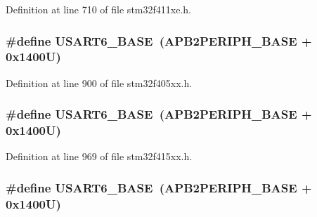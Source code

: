 Definition at line 710 of file stm32f411xe.\+h.

\subsubsection[{\texorpdfstring{U\+S\+A\+R\+T6\+\_\+\+B\+A\+SE}{USART6_BASE}}]{\setlength{\rightskip}{0pt plus 5cm}\#define U\+S\+A\+R\+T6\+\_\+\+B\+A\+SE~({\bf A\+P\+B2\+P\+E\+R\+I\+P\+H\+\_\+\+B\+A\+SE} + 0x1400\+U)}\hypertarget{group___peripheral__registers__structures_gade4d3907fd0387ee832f426f52d568bb}{}\label{group___peripheral__registers__structures_gade4d3907fd0387ee832f426f52d568bb}


Definition at line 900 of file stm32f405xx.\+h.

\subsubsection[{\texorpdfstring{U\+S\+A\+R\+T6\+\_\+\+B\+A\+SE}{USART6_BASE}}]{\setlength{\rightskip}{0pt plus 5cm}\#define U\+S\+A\+R\+T6\+\_\+\+B\+A\+SE~({\bf A\+P\+B2\+P\+E\+R\+I\+P\+H\+\_\+\+B\+A\+SE} + 0x1400\+U)}\hypertarget{group___peripheral__registers__structures_gade4d3907fd0387ee832f426f52d568bb}{}\label{group___peripheral__registers__structures_gade4d3907fd0387ee832f426f52d568bb}


Definition at line 969 of file stm32f415xx.\+h.

\subsubsection[{\texorpdfstring{U\+S\+A\+R\+T6\+\_\+\+B\+A\+SE}{USART6_BASE}}]{\setlength{\rightskip}{0pt plus 5cm}\#define U\+S\+A\+R\+T6\+\_\+\+B\+A\+SE~({\bf A\+P\+B2\+P\+E\+R\+I\+P\+H\+\_\+\+B\+A\+SE} + 0x1400\+U)}\hypertarget{group___peripheral__registers__structures_gade4d3907fd0387ee832f426f52d568bb}{}\label{group___peripheral__registers__structures_gade4d3907fd0387ee832f426f52d568bb}


